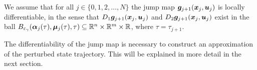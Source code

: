 \documentclass[../DC2017114Bouma.tex]{subfiles}
\begin{document}
\begin{sloppypar}
\begin{myass}\label{ass:jump}
We assume that for all $j \in \{0,1,2,\dots,N\}$ the jump map ${\boldsymbol{g}}_{j+1}({\boldsymbol{x}}_j,{\boldsymbol{u}}_j)$ is locally differentiable, in the sense that $D_1{\boldsymbol{g}}_{j+1}({\boldsymbol{x}}_j,{\boldsymbol{u}}_j)$ and $D_2{\boldsymbol{g}}_{j+1}({\boldsymbol{x}}_j,{\boldsymbol{u}}_j)$ exist in the ball $B_{\varepsilon_{\gamma}}(\boldsymbol{\alpha}_j(\tau),\boldsymbol{\mu}_j(\tau),\tau)\subseteq \mathbb{R}^n \times \mathbb{R}^m \times \mathbb{R}$, where $\tau = \tau_{j+1}$.
\end{myass}
\end{sloppypar}

The differentiability of the jump map is necessary to construct an approximation of the perturbed state trajectory. This will be explained in more detail in the next section.
\end{document}
